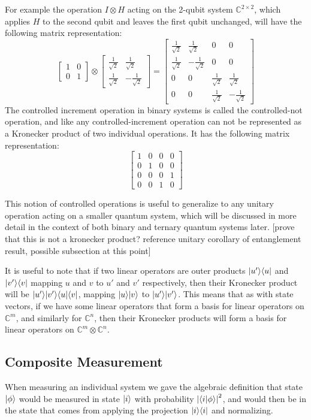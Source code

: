 For example the operation $I \otimes H$ acting on the 2-qubit system $\mathbb{C}^{2\times 2}$, which applies $H$ to the second qubit and leaves the first qubit unchanged, will have the following matrix representation:
\[
\left[\begin{matrix}
1&0\\
0&1
\end{matrix}\right]
\otimes
\left[\begin{matrix}
\frac{1}{\sqrt{2}}&\frac{1}{\sqrt{2}}\\
\frac{1}{\sqrt{2}}&-\frac{1}{\sqrt{2}}
\end{matrix}\right]
=
\left[\begin{matrix}
\frac{1}{\sqrt{2}}&\frac{1}{\sqrt{2}}&0&0\\
\frac{1}{\sqrt{2}}&-\frac{1}{\sqrt{2}}&0&0\\
0&0&\frac{1}{\sqrt{2}}&\frac{1}{\sqrt{2}}\\
0&0&\frac{1}{\sqrt{2}}&-\frac{1}{\sqrt{2}}
\end{matrix}\right]
\]
The controlled increment operation in binary systems is called the controlled-not operation, and like any controlled-increment operation can not be represented as a Kronecker product of two individual operations. It has the following matrix representation:
\[
\left[\begin{matrix}
1&0&0&0\\
0&1&0&0\\
0&0&0&1\\
0&0&1&0
\end{matrix}\right]
\]

This notion of controlled operations is useful to generalize to any unitary operation acting on a smaller quantum system, which will be discussed in more detail in the context of both binary and ternary quantum systems later. [prove that this is not a kronecker product? reference unitary corollary of entanglement result, possible subsection at this point]

It is useful to note that if two linear operators are outer products $| u' \rangle\langle u |$ and $| v' \rangle\langle v |$ mapping $u$ and $v$ to $u'$ and $v'$ respectively, then their Kronecker product will be $| u' \rangle| v' \rangle\langle u |\langle v |$, mapping $| u \rangle| v \rangle$ to $| u' \rangle| v' \rangle$. This means that as with state vectors, if we have some linear operators that form a basis for linear operators on $\mathbb{C}^m$, and similarly for $\mathbb{C}^n$, then their Kronecker products will form a basis for linear operators on $\mathbb{C}^m\otimes\mathbb{C}^n$.
\subsection{Composite Measurement}
When measuring an individual system we gave the algebraic definition that state $| \phi \rangle$ would be measured in state $| i \rangle$ with probability $\left| \langle i | \phi \rangle \right|^2$, and would then be in the state that comes from applying the projection $| i \rangle\langle i |$ and normalizing.

